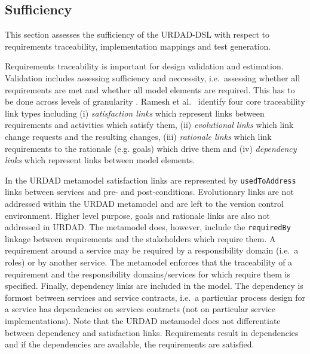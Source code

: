 
\subsection{Sufficiency}

This section assesses the sufficiency of the URDAD-DSL with respect to requirements traceability, implementation mappings and test generation. 

Requirements traceability is important for design validation and estimation. Validation includes assessing sufficiency and neccessity, i.e.\ assessing whether all requirements are met and whether all model elements are required. This has to be done across levels of granularity \cite{dick_design_2005}. Ramesh et al.\ \cite{ramesh_toward_2001} identify four core traceability link types including (i) \emph{satisfaction links} which represent links between requirements and activities which satisfy them, (ii) \emph{evolutional links} which link change requests and the resulting changes, (iii) \emph{rationale links} which link requirements to the rationale (e.g. goals) which drive them and (iv) \emph{dependency links} which represent links between model elements.

In the URDAD metamodel satisfaction links are represented by \verb+usedToAddress+ links between services and pre- and post-conditions. Evolutionary links are not addressed within the URDAD metamodel and are left to the version control environment. Higher level purpose, goals and rationale links are also not addressed in URDAD. The metamodel does, however, include the \verb+requiredBy+ linkage between requirements and the stakeholders which require them. A requirement around a service may be required by a responsibility domain (i.e.\ a roles) or by another service. The metamodel enforces that the traceability of a requirement and the responsibility domains/services for which require them is specified. Finally, dependency links are included in the model. The dependency is formost between services and service contracts, i.e.\ a particular process design for a service has dependencies on services contracts (not on particular service implementations). Note that the URDAD metamodel does not differentiate between dependency and satisfaction links. Requirements result in dependencies and if the dependencies are available, the requirements are satisfied.

